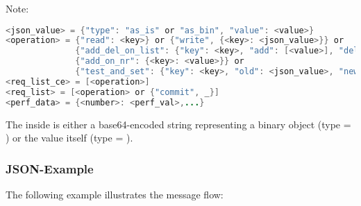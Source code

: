 Note:
\begin{lstlisting}[language=java]
<json_value> = {"type": "as_is" or "as_bin", "value": <value>}
<operation> = {"read": <key>} or {"write", {<key>: <json_value>}} or
              {"add_del_on_list": {"key": <key>, "add": [<value>], "del": [<value>]}} or
              {"add_on_nr": {<key>: <value>}} or
              {"test_and_set": {"key": <key>, "old": <json_value>, "new": <json_value>}}
<req_list_ce> = [<operation>]
<req_list> = [<operation> or {"commit", _}]
<perf_data> = {<number>: <perf_val>,...}
\end{lstlisting}
The  inside  is either a base64-encoded
string representing a binary object (type = ) or the value
itself (type = ).

\subsubsection{JSON-Example}

The following example illustrates the message flow:

